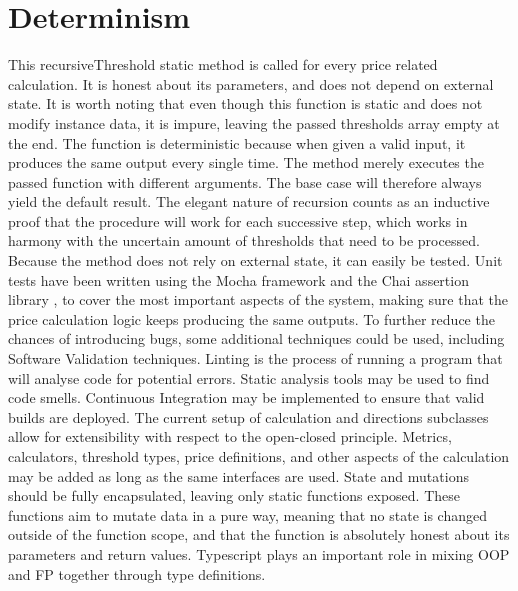 %
\section{Determinism}
This recursiveThreshold static method is called for every price related calculation. It is honest about its parameters, and does not depend on external state. It is worth noting that even though this function is static and does not modify instance data, it is impure, leaving the passed thresholds array empty at the end. The function is deterministic because when given a valid input, it produces the same output every single time. The method merely executes the passed function with different arguments. The base case will therefore always yield the default result. The elegant nature of recursion counts as an inductive proof that the procedure will work for each successive step, which works in harmony with the uncertain amount of thresholds that need to be processed. Because the method does not rely on external state, it can easily be tested. Unit tests have been written using the Mocha framework \cite{mocha} and the Chai assertion library \cite{chai}, to cover the most important aspects of the system, making sure that the price calculation logic keeps producing the same outputs. To further reduce the chances of introducing bugs, some additional techniques could be used, including Software Validation techniques. Linting is the process of running a program that will analyse code for potential errors. Static analysis tools may be used to find code smells. Continuous Integration may be implemented to ensure that valid builds are deployed. The current setup of calculation and directions subclasses allow for extensibility with respect to the open-closed principle. Metrics, calculators, threshold types, price definitions, and other aspects of the calculation may be added as long as the same interfaces are used. State and mutations should be fully encapsulated, leaving only static functions exposed. These functions aim to mutate data in a pure way, meaning that no state is changed outside of the function scope, and that the function is absolutely honest about its parameters and return values. Typescript plays an important role in mixing OOP and FP together through type definitions.


